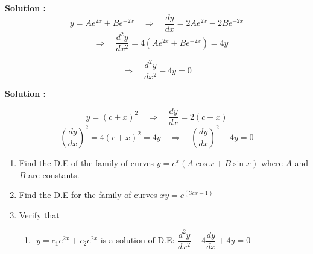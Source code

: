 \documentclass[a4aper,12pt]{report}
\begin{document}
\vspace{1em}
\begin{tcolorbox}[breakable, title = {\textbf{Example 1.7: Find the D.E of the relation $y = Ae^{2x} + Be^{-2x} $, where A, B are constants.}}]
    \textbf{Solution : }
\[
y = Ae^{2x} + Be^{-2x}
\quad \Rightarrow \quad \frac{dy}{dx} = 2Ae^{2x} - 2Be^{-2x}\]
\[
\quad \Rightarrow \quad \frac{d^2y}{dx^2} = 4(Ae^{2x} + Be^{-2x}) = 4y
\]

\[
\Rightarrow \quad \frac{d^2y}{dx^2} - 4y = 0
\]

\end{tcolorbox}

 \begin{tcolorbox}[breakable, title = {\textbf{Example 1.8: Find the DE of the relation \( y = (c + x)^2 \)}}]
    \textbf{Solution : }

\[
y = (c + x)^2
\quad \Rightarrow \quad \frac{dy}{dx} = 2(c + x)
\]
\[
\left( \frac{dy}{dx} \right)^2 = 4(c + x)^2 = 4y
\quad \Rightarrow \quad \left( \frac{dy}{dx} \right)^2 - 4y = 0
\]
 \end{tcolorbox}
\begin{tcolorbox}[breakable, title = H.W:]
    \begin{enumerate}
    \item Find the D.E of the family of curves $y=e^x(A\cos x+B\sin x)$ where $A$ and $B$ are constants. 
    \item Find the D.E for the family of curves $xy=c^{(3cx-1)}$
    \item Verify that \vspace*{-10pt}
    \begin{enumerate}
        \item $\,\,y=c_1e^{2x}+c_2e^{2x}$ is a solution of D.E: $\dfrac{d^2y}{dx^2}-4\dfrac{dy}{dx}+4y=0$  
    \end{enumerate}
\end{enumerate}
\end{tcolorbox}
\end{document}

